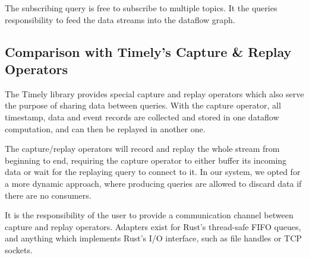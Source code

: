 The subscribing query is free to subscribe to multiple topics. It the queries
responsibility to feed the data streams into the dataflow graph.

\subsection{Comparison with Timely's Capture \& Replay Operators}

The Timely library provides special capture and replay operators which also serve the
purpose of sharing data between queries. With the capture operator, all timestamp,
data and event records are collected and stored in one dataflow computation,
and can then be replayed in another one.

The capture/replay operators will record and replay the whole stream from beginning
to end, requiring the capture operator to either buffer its incoming data or
wait for the replaying query to connect to it. 
In our system, we opted for a more dynamic approach, where
producing queries are allowed to discard data if there are no consumers.

It is the responsibility of the user to provide a communication channel between
capture and  replay operators. Adapters exist for Rust's thread-safe FIFO queues,
and anything which implements Rust's I/O interface, such as file handles or 
TCP sockets.

